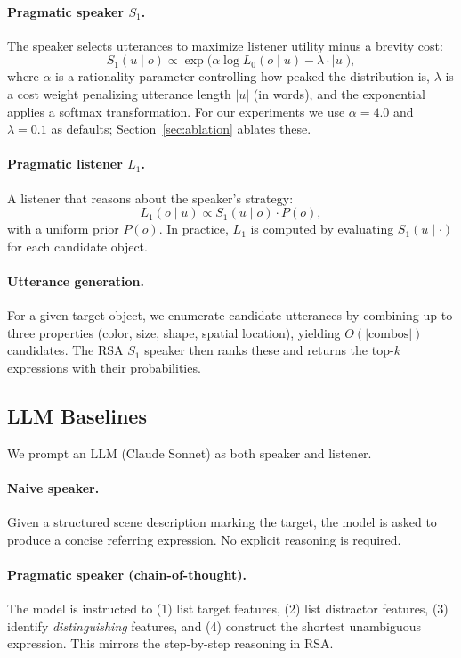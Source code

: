 \documentclass[10pt]{article}
\begin{document}
\paragraph{Pragmatic speaker $S_1$.} The speaker selects utterances to maximize listener utility minus a brevity cost:
\[
S_1(u \mid o) \propto \exp\!\Big(\alpha \log L_0(o \mid u) - \lambda \cdot |u|\Big),
\]
where $\alpha$ is a rationality parameter controlling how peaked the distribution is, $\lambda$ is a cost weight penalizing utterance length $|u|$ (in words), and the exponential applies a softmax transformation. For our experiments we use $\alpha = 4.0$ and $\lambda = 0.1$ as defaults; Section~\ref{sec:ablation} ablates these.

\paragraph{Pragmatic listener $L_1$.} A listener that reasons about the speaker's strategy:
\[
L_1(o \mid u) \propto S_1(u \mid o) \cdot P(o),
\]
with a uniform prior $P(o)$. In practice, $L_1$ is computed by evaluating $S_1(u \mid \cdot)$ for each candidate object.

\paragraph{Utterance generation.} For a given target object, we enumerate candidate utterances by combining up to three properties (color, size, shape, spatial location), yielding $O(|\text{combos}|)$ candidates. The RSA $S_1$ speaker then ranks these and returns the top-$k$ expressions with their probabilities.

\subsection{LLM Baselines}

We prompt an LLM (Claude Sonnet) as both speaker and listener.

\paragraph{Naive speaker.} Given a structured scene description marking the target, the model is asked to produce a concise referring expression. No explicit reasoning is required.

\paragraph{Pragmatic speaker (chain-of-thought).} The model is instructed to (1) list target features, (2) list distractor features, (3) identify \emph{distinguishing} features, and (4) construct the shortest unambiguous expression. This mirrors the step-by-step reasoning in RSA.
\end{document}
